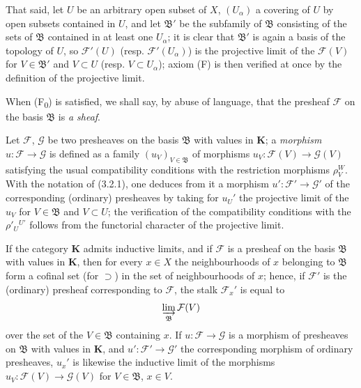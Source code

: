 \begin{env}[3.2.2]
That said, let $U$ be an arbitrary open subset of $X$, $(U_\alpha)$ a covering
of $U$ by open subsets contained in $U$, and let $\mathfrak{B}'$ be the
subfamily of $\mathfrak{B}$ consisting of the sets
of $\mathfrak{B}$ contained in at least one $U_\alpha$; it is clear that
$\mathfrak{B}'$ is again a basis of the topology of $U$, so
$\mathcal{F}'(U)$ (resp. $\mathcal{F}'(U_\alpha)$) is the projective limit of the
$\mathcal{F}(V)$ for $V\in\mathfrak{B}'$ and $V\subset U$ (resp.
$V\subset U_\alpha$); axiom (F) is then verified at once by the
definition of the projective limit.

When (F\textsubscript{0}) is satisfied, we shall say, by abuse of language, that
the presheaf $\mathcal{F}$ on the basis $\mathfrak{B}$ is \emph{a sheaf}.
\end{env}

\begin{env}[3.2.3]
\label{0.3.2.3}
Let $\mathcal{F}$, $\mathcal{G}$ be two presheaves on the basis
$\mathfrak{B}$ with values in $\boldsymbol{K}$; a \emph{morphism}
$u:\mathcal{F}\to\mathcal{G}$ is defined as a family
$(u_V)_{V\in\mathfrak{B}}$ of morphisms
$u_V:\mathcal{F}(V)\to\mathcal{G}(V)$ satisfying the usual compatibility
conditions with the restriction morphisms $\rho_V^W$. With
the notation of (3.2.1), one deduces from it a morphism
$u':\mathcal{F}'\to\mathcal{G}'$ of the corresponding (ordinary) presheaves
by taking for $u_U'$ the projective limit of the $u_V$ for
$V\in\mathfrak{B}$ and $V\subset U$; the verification of the
compatibility conditions with the $\rho'_U{}^{U'}$ follows from the functorial character of the
projective limit.
\end{env}

\begin{env}[3.2.4]
\label{0.3.2.4}
If the category $\boldsymbol{K}$ admits inductive limits, and if $\mathcal{F}$
is a presheaf on the basis $\mathfrak{B}$ with values in $\boldsymbol{K}$,
then for every $x\in X$ the neighbourhoods of $x$ belonging to $\mathfrak{B}$ form
a cofinal set (for $\supset$) in the set of neighbourhoods of $x$;
hence, if $\mathcal{F}'$ is the (ordinary) presheaf corresponding to
$\mathcal{F}$, the stalk $\mathcal{F}_x'$ is equal to
\[
  \varinjlim_{\mathfrak{B}}\mathcal{F}(V)
\]
over the set of the $V\in\mathfrak{B}$ containing $x$.
If $u:\mathcal{F}\to\mathcal{G}$ is a morphism of presheaves on
$\mathfrak{B}$ with values in $\boldsymbol{K}$, and
$u':\mathcal{F}'\to\mathcal{G}'$ the corresponding morphism of ordinary
presheaves, $u_x'$ is likewise the inductive limit of the morphisms
$u_V:\mathcal{F}(V)\to\mathcal{G}(V)$ for $V\in\mathfrak{B}$, $x\in V$.
\end{env}

